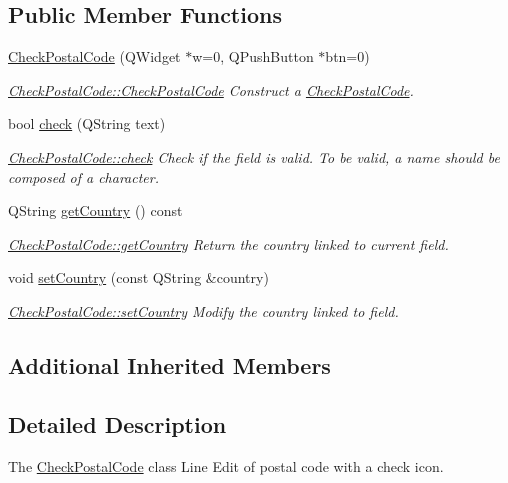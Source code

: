 \subsection*{Public Member Functions}
\begin{DoxyCompactItemize}
\item 
\hyperlink{classCheckPostalCode_a98cce06b95b46bf285cf6bc6e52cbfcb}{Check\+Postal\+Code} (Q\+Widget $\ast$w=0, Q\+Push\+Button $\ast$btn=0)
\begin{DoxyCompactList}\small\item\em \hyperlink{classCheckPostalCode_a98cce06b95b46bf285cf6bc6e52cbfcb}{Check\+Postal\+Code\+::\+Check\+Postal\+Code} Construct a \hyperlink{classCheckPostalCode}{Check\+Postal\+Code}. \end{DoxyCompactList}\item 
bool \hyperlink{classCheckPostalCode_ad91ba5622617675fbb5c767036163142}{check} (Q\+String text)
\begin{DoxyCompactList}\small\item\em \hyperlink{classCheckPostalCode_ad91ba5622617675fbb5c767036163142}{Check\+Postal\+Code\+::check} Check if the field is valid. To be valid, a name should be composed of a character. \end{DoxyCompactList}\item 
Q\+String \hyperlink{classCheckPostalCode_a3691eb5a484579a77622529ae25261a4}{get\+Country} () const 
\begin{DoxyCompactList}\small\item\em \hyperlink{classCheckPostalCode_a3691eb5a484579a77622529ae25261a4}{Check\+Postal\+Code\+::get\+Country} Return the country linked to current field. \end{DoxyCompactList}\item 
void \hyperlink{classCheckPostalCode_ac82e538c932bd9165d3d40ea949baa4b}{set\+Country} (const Q\+String \&country)
\begin{DoxyCompactList}\small\item\em \hyperlink{classCheckPostalCode_ac82e538c932bd9165d3d40ea949baa4b}{Check\+Postal\+Code\+::set\+Country} Modify the {\itshape country} linked to field. \end{DoxyCompactList}\end{DoxyCompactItemize}
\subsection*{Additional Inherited Members}


\subsection{Detailed Description}
The \hyperlink{classCheckPostalCode}{Check\+Postal\+Code} class Line Edit of postal code with a check icon. 

